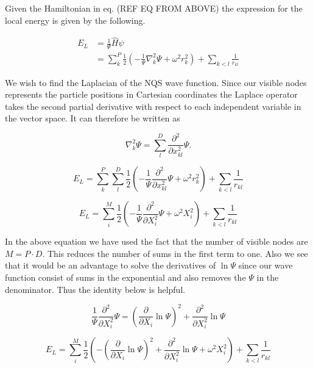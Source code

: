 Given the Hamiltonian in eq. (REF EQ FROM ABOVE) the expression for the local energy is given by the following.

\begin{align*}
E_L &= \frac{1}{\Psi}\hat{H}\psi \\
&= \sum_{k}^{P} \frac{1}{2} \left( -\frac{1}{\Psi} \nabla_k^2 \Psi +  \omega^2 r_k^2 \right) + \sum_{k < l} \frac{1}{r_{kl}}
\end{align*}

We wish to find the Laplacian of the NQS wave function. Since our visible nodes represents the particle positions in Cartesian coordinates the Laplace operator takes the second partial derivative with respect to each independent variable in the vector space. It can therefore be written as  

\begin{equation*}
\nabla_k^2 \Psi = \sum_{l}^{D} \frac{\partial^2}{\partial x_{kl}^2} \Psi.
\end{equation*}

\begin{equation*}
E_L = \sum_{k}^{P} \sum_{l}^{D} \frac{1}{2} \left( -\frac{1}{\Psi} \frac{\partial^2}{\partial x_{kl}^2} \Psi +  \omega^2 r_k^2 \right) + \sum_{k < l} \frac{1}{r_{kl}}
\end{equation*}

\begin{equation*}
E_L = \sum_{i}^{M} \frac{1}{2} \left( -\frac{1}{\Psi} \frac{\partial^2}{\partial X_{i}^2} \Psi +  \omega^2 X_i^2 \right) +  \sum_{k < l} \frac{1}{r_{kl}}
\end{equation*}

In the above equation we have used the fact that the number of visible nodes are $M = P \cdot D$. This reduces the number of sums in the first term to one. Also we see that it would be an advantage to solve the derivatives of $\ln \Psi$ since our wave function consist of sums in the exponential and also removes the $\Psi$ in the denominator. Thus the identity below is helpful. 

\begin{equation*}
\frac{1}{\Psi} \frac{\partial^2}{\partial X_{i}^2} \Psi = \left( \frac{\partial}{\partial X_{i}} \ln \Psi \right)^2 + \frac{\partial^2}{\partial X_{i}^2} \ln \Psi
\end{equation*}


\begin{equation*}
E_L = \sum_{i}^{M} \frac{1}{2} \left( - \left( \frac{\partial}{\partial X_{i}} \ln \Psi \right)^2 + \frac{\partial^2}{\partial X_{i}^2} \ln \Psi  + \omega^2 X_i^2 \right) +  \sum_{k < l} \frac{1}{r_{kl}}
\end{equation*}

